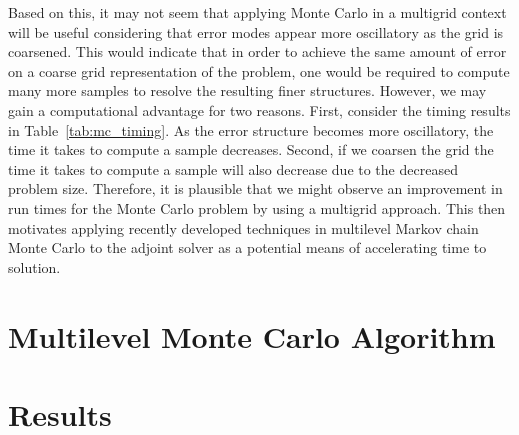 \documentclass[note]{TechNote}
\begin{document}
Based on this, it may not seem that applying Monte Carlo in a
multigrid context will be useful considering that error modes appear
more oscillatory as the grid is coarsened. This would indicate that in
order to achieve the same amount of error on a coarse grid
representation of the problem, one would be required to compute many
more samples to resolve the resulting finer structures. However, we
may gain a computational advantage for two reasons. First, consider
the timing results in Table~\ref{tab:mc_timing}. As the error
structure becomes more oscillatory, the time it takes to compute a
sample decreases. Second, if we coarsen the grid the time it takes to
compute a sample will also decrease due to the decreased problem
size. Therefore, it is plausible that we might observe an improvement
in run times for the Monte Carlo problem by using a multigrid
approach. This then motivates applying recently developed techniques
in multilevel Markov chain Monte Carlo to the adjoint solver as a
potential means of accelerating time to solution.

\section{Multilevel Monte Carlo Algorithm}
\label{sec:algorithm}


\section{Results}
\label{sec:results}




\closing
\caution
\end{document}
